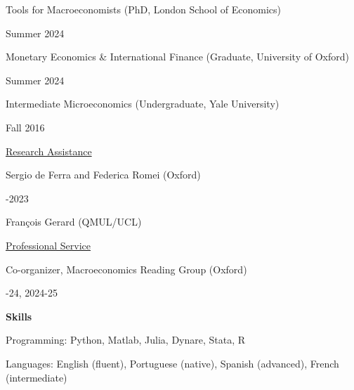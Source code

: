 \documentclass[letterpaper,10pt,oneside]{article}
\begin{document}
\noindent  Tools for Macroeconomists (PhD, London School of Economics)\hfill \begin{minipage}[t]{6cm}\raggedleft
Summer 2024
\end{minipage}

\noindent Monetary Economics \& International Finance (Graduate, University of Oxford)\hfill \begin{minipage}[t]{4cm}\raggedleft
Summer 2024
\end{minipage}

\noindent Intermediate Microeconomics (Undergraduate, Yale University) \hfill \begin{minipage}[t]{6cm}\raggedleft
Fall 2016
\end{minipage}

\vspace{3mm}

\noindent \normalsize \underline{Research Assistance}

\vspace{1mm}
\noindent  Sergio de Ferra and Federica Romei (Oxford) \hfill \begin{minipage}[t]{4cm}-2023
\end{minipage}

\noindent François Gerard (QMUL/UCL) \hfill \begin{minipage}[t]{6cm}
\end{minipage}
\vspace{3mm}

\noindent \normalsize \underline{Professional Service}

\vspace{1mm}
\noindent Co-organizer, Macroeconomics Reading Group (Oxford)\hfill\begin{minipage}[t]{4cm}-24, 2024-25
\end{minipage}

\vspace{4mm}

\noindent \large \textbf{Skills}

\vspace{3mm} \normalsize

\noindent Programming: Python, Matlab, Julia, Dynare, Stata, R

\noindent Languages: English (fluent), Portuguese (native), Spanish (advanced), French (intermediate)


\vspace{4mm}
\end{document}
